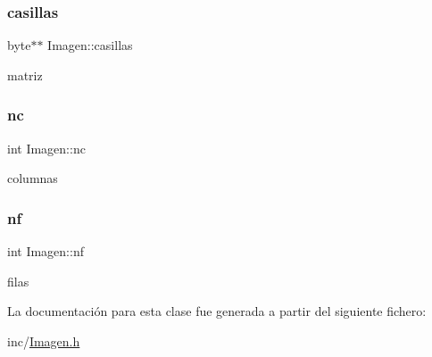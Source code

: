 \subsubsection{\texorpdfstring{casillas}{casillas}}
{\footnotesize\ttfamily byte$\ast$$\ast$ Imagen\+::casillas\hspace{0.3cm}{\ttfamily [private]}}

matriz \mbox{\label{classImagen_a0921ad9dff3caf6bb4d86eb7c1aeba60}} 
\subsubsection{\texorpdfstring{nc}{nc}}
{\footnotesize\ttfamily int Imagen\+::nc\hspace{0.3cm}{\ttfamily [private]}}

columnas \mbox{\label{classImagen_ae057b7b7de2b7d6371f9c89fdc3358fe}} 
\subsubsection{\texorpdfstring{nf}{nf}}
{\footnotesize\ttfamily int Imagen\+::nf\hspace{0.3cm}{\ttfamily [private]}}

filas 

La documentación para esta clase fue generada a partir del siguiente fichero\+:\begin{DoxyCompactItemize}
\item 
inc/\hyperlink{Imagen_8h}{Imagen.\+h}\end{DoxyCompactItemize}
